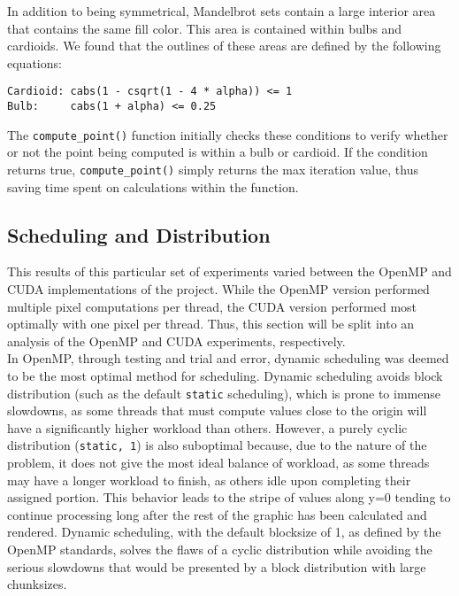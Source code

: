 \documentclass{article}
\begin{document}
In addition to being symmetrical, Mandelbrot sets contain a large interior
area that contains the same fill color.
This area is contained within bulbs and cardioids.
We found that the outlines of these areas are defined by the following 
equations:

\begin{verbatim}
Cardioid: cabs(1 - csqrt(1 - 4 * alpha)) <= 1
Bulb:     cabs(1 + alpha) <= 0.25
\end{verbatim}

The \verb|compute_point()| function initially checks these conditions to
verify whether or not the point being computed is within a bulb or cardioid.
If the condition returns true, \verb|compute_point()| simply returns the
max iteration value, thus saving time spent on calculations within the 
function.

\subsection{Scheduling and Distribution}

This results of this particular set of experiments varied between the
OpenMP and CUDA implementations of the project.
While the OpenMP version performed multiple pixel computations per thread,
the CUDA version performed most optimally with one pixel per thread.
Thus, this section will be split into an analysis of the OpenMP and CUDA 
experiments, respectively.\\

In OpenMP, through testing and trial and error, dynamic scheduling was 
deemed to be the most optimal method for scheduling. Dynamic scheduling 
avoids block distribution (such as the default \verb|static| scheduling),
which is prone to immense slowdowns, as some threads that must compute 
values close to the origin will have a significantly higher workload than
others.
However, a purely cyclic distribution (\verb|static, 1|) is also suboptimal
because, due to the nature of the problem, it does not give the most ideal
balance of workload, as some threads may have a longer workload to finish, 
as others idle upon completing their assigned portion. This behavior leads
to the stripe of values along y=0 tending to continue processing long after
the rest of the graphic has been calculated and rendered.
Dynamic scheduling, with the default blocksize of 1, as defined by the 
OpenMP standards, solves the flaws of a cyclic distribution while avoiding 
the serious slowdowns that would be presented by a block distribution with 
large chunksizes.\\
\end{document}
